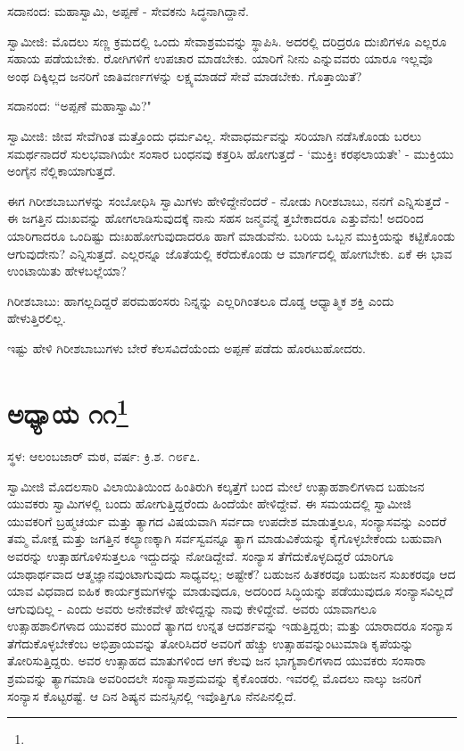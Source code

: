 ಸದಾನಂದ: ಮಹಾಸ್ವಾಮಿ, ಅಪ್ಪಣೆ - ಸೇವಕನು ಸಿದ್ಧನಾಗಿದ್ದಾನೆ.

ಸ್ವಾಮೀಜಿ: ಮೊದಲು ಸಣ್ಣ ಕ್ರಮದಲ್ಲಿ ಒಂದು ಸೇವಾಶ್ರಮವನ್ನು ಸ್ಥಾಪಿಸಿ. ಅದರಲ್ಲಿ ದರಿದ್ರರೂ ದುಃಖಿಗಳೂ ಎಲ್ಲರೂ ಸಹಾಯ ಪಡೆಯಬೇಕು. ರೋಗಿಗಳಿಗೆ ಉಪಚಾರ ಮಾಡಬೇಕು. ಯಾರಿಗೆ ನೀನು ಎನ್ನುವವರು ಯಾರೂ ಇಲ್ಲವೊ ಅಂಥ ದಿಕ್ಕಿಲ್ಲದ ಜನರಿಗೆ ಜಾತಿವರ್ಣಗಳನ್ನು ಲಕ್ಷ್ಯಮಾಡದೆ ಸೇವೆ ಮಾಡಬೇಕು. ಗೊತ್ತಾಯಿತೆ?

ಸದಾನಂದ: “ಅಪ್ಪಣೆ ಮಹಾಸ್ವಾಮಿ?"

ಸ್ವಾಮೀಜಿ: ಜೀವ ಸೇವೆಗಿಂತ ಮತ್ತೊಂದು ಧರ್ಮವಿಲ್ಲ. ಸೇವಾಧರ್ಮವನ್ನು ಸರಿಯಾಗಿ ನಡೆಸಿಕೊಂಡು ಬರಲು ಸಮರ್ಥನಾದರೆ ಸುಲಭವಾಗಿಯೇ ಸಂಸಾರ ಬಂಧನವು ಕತ್ತರಿಸಿ ಹೋಗುತ್ತದೆ - ‘ಮುಕ್ತಿಃ ಕರಫಲಾಯತೇ’ - ಮುಕ್ತಿಯು ಅಂಗೈನ ನೆಲ್ಲಿಕಾಯಾಗುತ್ತದೆ.

ಈಗ ಗಿರೀಶಬಾಬುಗಳನ್ನು ಸಂಬೋಧಿಸಿ ಸ್ವಾಮಿಗಳು ಹೇಳಿದ್ದೇನೆಂದರೆ - ನೋಡು ಗಿರೀಶಬಾಬು, ನನಗೆ ಎನ್ನಿಸುತ್ತದೆ - ಈ ಜಗತ್ತಿನ ದುಃಖವನ್ನು ಹೋಗಲಾಡಿಸುವುದಕ್ಕೆ ನಾನು ಸಹಸ ಜನ್ಮವನ್ನೆ ತ್ತಬೇಕಾದರೂ ಎತ್ತುವೆನು! ಅದರಿಂದ ಯಾರಿಗಾದರೂ ಒಂದಿಷ್ಟು ದುಃಖಹೋಗುವುದಾದರೂ ಹಾಗೆ ಮಾಡುವೆನು. ಬರಿಯ ಒಬ್ಬನ ಮುಕ್ತಿಯನ್ನು ಕಟ್ಟಿಕೊಂಡು ಆಗುವುದೇನು? ಎನ್ನಿಸುತ್ತದೆ. ಎಲ್ಲರನ್ನೂ ಜೊತೆಯಲ್ಲಿ ಕರೆದುಕೊಂಡು ಆ ಮಾರ್ಗದಲ್ಲಿ ಹೋಗಬೇಕು. ಏಕೆ ಈ ಭಾವ ಉಂಟಾಯಿತು ಹೇಳಬಲ್ಲೆಯಾ?

ಗಿರೀಶಬಾಬು: ಹಾಗಲ್ಲದಿದ್ದರೆ ಪರಮಹಂಸರು ನಿನ್ನನ್ನು ಎಲ್ಲರಿಗಿಂತಲೂ ದೊಡ್ಡ ಆಧ್ಯಾತ್ಮಿಕ ಶಕ್ತಿ ಎಂದು ಹೇಳುತ್ತಿರಲಿಲ್ಲ.

ಇಷ್ಟು ಹೇಳಿ ಗಿರೀಶಬಾಬುಗಳು ಬೇರೆ ಕೆಲಸವಿದೆಯೆಂದು ಅಪ್ಪಣೆ ಪಡೆದು ಹೊರಟುಹೋದರು.

\newpage

\chapter[ಅಧ್ಯಾಯ ೧೧]{ಅಧ್ಯಾಯ ೧೧\protect\footnote{}}

\begin{center}
ಸ್ಥಳ: ಆಲಂಬಜಾರ್ ಮಠ, ವರ್ಷ: ಕ್ರಿ.ಶ. ೧೮೯೭.
\end{center}

ಸ್ವಾಮೀಜಿ ಮೊದಲಸಾರಿ ವಿಲಾಯಿತಿಯಿಂದ ಹಿಂತಿರುಗಿ ಕಲ್ಕತ್ತೆಗೆ ಬಂದ ಮೇಲೆ ಉತ್ಸಾಹಶಾಲಿಗಳಾದ ಬಹುಜನ ಯುವಕರು ಸ್ವಾಮಿಗಳಲ್ಲಿ ಬಂದು ಹೋಗುತ್ತಿದ್ದರೆಂದು ಹಿಂದೆಯೇ ಹೇಳಿದ್ದೇವೆ. ಈ ಸಮಯದಲ್ಲಿ ಸ್ವಾಮೀಜಿ ಯುವಕರಿಗೆ ಬ್ರಹ್ಮಚರ್ಯ ಮತ್ತು ತ್ಯಾಗದ ವಿಷಯವಾಗಿ ಸರ್ವದಾ ಉಪದೇಶ ಮಾಡುತ್ತಲೂ, ಸಂನ್ಯಾಸವನ್ನು ಎಂದರೆ ತಮ್ಮ ಮೋಕ್ಷ ಮತ್ತು ಜಗತ್ತಿನ ಕಲ್ಯಾಣಕ್ಕಾಗಿ ಸರ್ವಸ್ವವನ್ನೂ ತ್ಯಾಗ ಮಾಡುವಿಕೆಯನ್ನು ಕೈಗೊಳ್ಳಬೇಕೆಂದು ಬಹುವಾಗಿ ಅವರನ್ನು ಉತ್ಸಾಹಗೊಳಿಸುತ್ತಲೂ ಇದ್ದುದನ್ನು ನೋಡಿದ್ದೇವೆ. ಸಂನ್ಯಾಸ ತೆಗೆದುಕೊಳ್ಳದಿದ್ದರೆ ಯಾರಿಗೂ ಯಾಥಾರ್ಥವಾದ ಆತ್ಮಜ್ಞಾನವುಂಟಾಗುವುದು ಸಾಧ್ಯವಲ್ಲ; ಅಷ್ಟೇಕೆ? ಬಹುಜನ ಹಿತಕರವೂ ಬಹುಜನ ಸುಖಕರವೂ ಆದ ಯಾವ ವಿಧವಾದ ಐಹಿಕ ಕಾರ್ಯಕ್ರಮಗಳನ್ನು ಮಾಡುವುದೂ, ಅದರಿಂದ ಸಿದ್ಧಿಯನ್ನು ಪಡೆಯುವುದೂ ಸಂನ್ಯಾಸವಿಲ್ಲದೆ ಆಗುವುದಿಲ್ಲ - ಎಂದು ಅವರು ಅನೇಕವೇಳೆ ಹೇಳಿದ್ದನ್ನು ನಾವು ಕೇಳಿದ್ದೇವೆ. ಅವರು ಯಾವಾಗಲೂ ಉತ್ಸಾಹಶಾಲಿಗಳಾದ ಯುವಕರ ಮುಂದೆ ತ್ಯಾಗದ ಉನ್ನತ ಆದರ್ಶವನ್ನು ಇಡುತ್ತಿದ್ದರು; ಮತ್ತು ಯಾರಾದರೂ ಸಂನ್ಯಾಸ ತೆಗೆದುಕೊಳ್ಳಬೇಕೆಂಬ ಅಭಿಪ್ರಾಯವನ್ನು ತೋರಿಸಿದರೆ ಅವರಿಗೆ ಹೆಚ್ಚು ಉತ್ಸಾಹವನ್ನುಂಟುಮಾಡಿ ಕೃಪೆಯನ್ನು ತೋರಿಸುತ್ತಿದ್ದರು. ಅವರ ಉತ್ಸಾಹದ ಮಾತುಗಳಿಂದ ಆಗ ಕೆಲವು ಜನ ಭಾಗ್ಯಶಾಲಿಗಳಾದ ಯುವಕರು ಸಂಸಾರಾ ಶ್ರಮವನ್ನು ತ್ಯಾಗಮಾಡಿ ಅವರಿಂದಲೇ ಸಂನ್ಯಾಸಾಶ್ರಮವನ್ನು ಕೈಕೊಂಡರು. ಇವರಲ್ಲಿ ಮೊದಲು ನಾಲ್ಕು ಜನರಿಗೆ ಸಂನ್ಯಾಸ ಕೊಟ್ಟರಷ್ಟೆ. ಆ ದಿನ ಶಿಷ್ಯನ ಮನಸ್ಸಿನಲ್ಲಿ ಇವೊತ್ತಿಗೂ ನೆನಪಿನಲ್ಲಿದೆ.

